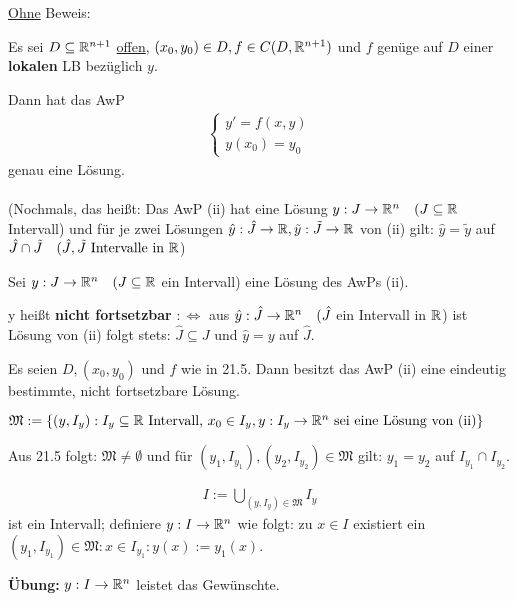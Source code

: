 \documentclass[a4paper,twoside,DIV15,BCOR12mm,chapterprefix=true,headings=twolinechapter]{scrbook}
\begin{document}
\underline{Ohne} Beweis:
\begin{satz}
Es sei $D \subseteq \mathbb{R}^{n+1}$ \underline{offen}, $(x_0, y_0) \in D, f\in C(D, \mathbb{R}^{n+1})$ und $f$ genüge auf $D$ einer \textbf{lokalen} LB bezüglich $y$.

Dann hat das AwP
\begin{align*} \begin{cases}
y' = f(x,y)\\
y(x_0) = y_0
\end{cases}
\label{(ii)}
\end{align*}
genau eine Lösung.
\\
\\
(Nochmals, das heißt: Das AwP (ii) hat eine Lösung $y: J \to \mathbb{R}^n\quad(J \subseteq \mathbb{R}$ Intervall) und für je zwei Lösungen $\hat y : \hat J \to \mathbb{R}, \tilde y : \tilde J \to \mathbb{R}$ von (ii) gilt: $\hat y = \tilde y$ auf $\hat J \cap \tilde J \quad (\hat J, \tilde J \text{ Intervalle in } \mathbb{R}$)
\end{satz}

\begin{definition}
Sei $y: J \to \mathbb{R}^n\quad(J \subseteq \mathbb{R}$ ein Intervall) eine Lösung des AwPs (ii).

y heißt \textbf{nicht fortsetzbar} $:\iff$ aus $\hat y : \hat J \to \mathbb{R}^n\quad(\hat J$ ein Intervall in $\mathbb{R}$) ist Lösung von (ii) folgt stets: $\hat J \subseteq J$ und $\hat y = y$ auf $\hat J$.
\end{definition}

\begin{satz}
Es seien $D, (x_0, y_0)$ und $f$ wie in 21.5. Dann besitzt das AwP (ii) eine eindeutig bestimmte, nicht fortsetzbare Lösung.
\end{satz}

\begin{beweis}
$\mathfrak{M} := \{ (y,I_y) : I_y \subseteq \mathbb{R} \text{ Intervall, } x_0 \in I_y, y: I_y \to \mathbb{R}^n \text{ sei eine Lösung von (ii)} \}$

Aus 21.5 folgt: $\mathfrak{M} \ne \emptyset$ und für $(y_1, I_{y_1}), (y_2, I_{y_2}) \in \mathfrak{M}$ gilt: $y_1 = y_2$ auf $I_{y_1} \cap I_{y_2}$.

\begin{align*}I := \bigcup_{(y, I_y) \in \mathfrak{M}} I_y\end{align*} ist ein Intervall; definiere $y: I \to \mathbb{R}^n$ wie folgt: zu $x \in I$ existiert ein $(y_1, I_{y_1}) \in \mathfrak{M}: x \in I_{y_1}: y(x) := y_1(x)$.

\textbf{Übung:} $y: I \to \mathbb{R}^n$ leistet das Gewünschte.
\end{beweis}
\end{document}
